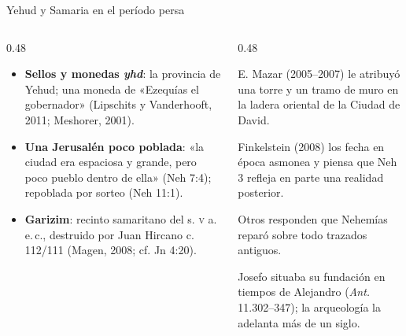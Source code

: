 \begin{frame}{Yehud y Samaria en el período persa}
\begin{columns}[T,onlytextwidth]
\begin{column}{0.48\textwidth}\footnotesize
\begin{itemize}
\item \textbf{Sellos y monedas \emph{yhd}}: la provincia de Yehud; una moneda de «Ezequías el gobernador» (Lipschits y Vanderhooft, 2011; Meshorer, 2001).\medskip
\item \textbf{Una Jerusalén poco poblada}: «la ciudad era espaciosa y grande, pero poco pueblo dentro de ella» (Neh 7:4); repoblada por sorteo (Neh 11:1).\medskip
\item \textbf{Garizim}: recinto samaritano del s. \textsc{v} a.\,e.\,c., destruido por Juan Hircano c. 112/111 (Magen, 2008; cf. Jn 4:20).
\end{itemize}
\end{column}
\begin{column}{0.48\textwidth}
\begin{notalam}
\footnotesize
E. Mazar (2005--2007) le atribuyó una torre y un tramo de muro en la ladera oriental de la Ciudad de David.\par\smallskip
Finkelstein (2008) los fecha en época asmonea y piensa que Neh 3 refleja en parte una realidad posterior.\par\smallskip
Otros responden que Nehemías reparó sobre todo trazados antiguos.
\end{notalam}
\begin{notalam}
\footnotesize Josefo situaba su fundación en tiempos de Alejandro (\emph{Ant.} 11.302--347); la arqueología la adelanta más de un siglo.
\end{notalam}
\end{column}
\end{columns}
\end{frame}

